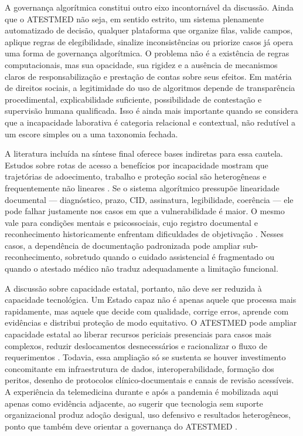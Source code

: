 \documentclass[12pt,a4paper]{article}
\begin{document}
A governança algorítmica constitui outro eixo incontornável da discussão. Ainda que o ATESTMED não seja, em sentido estrito, um sistema plenamente automatizado de decisão, qualquer plataforma que organize filas, valide campos, aplique regras de elegibilidade, sinalize inconsistências ou priorize casos já opera uma forma de governança algorítmica. O problema não é a existência de regras computacionais, mas sua opacidade, sua rigidez e a ausência de mecanismos claros de responsabilização e prestação de contas sobre seus efeitos. Em matéria de direitos sociais, a legitimidade do uso de algoritmos depende de transparência procedimental, explicabilidade suficiente, possibilidade de contestação e supervisão humana qualificada. Isso é ainda mais importante quando se considera que a incapacidade laborativa é categoria relacional e contextual, não redutível a um escore simples ou a uma taxonomia fechada.

A literatura incluída na síntese final oferece bases indiretas para essa cautela. Estudos sobre rotas de acesso a benefícios por incapacidade mostram que trajetórias de adoecimento, trabalho e proteção social são heterogêneas e frequentemente não lineares \parencite{sainsbury2006routesontoincapacitybenefitsfindingsfromqualitati,corden2001incapacitybenefitsandworkincentives}. Se o sistema algorítmico pressupõe linearidade documental — diagnóstico, prazo, CID, assinatura, legibilidade, coerência — ele pode falhar justamente nos casos em que a vulnerabilidade é maior. O mesmo vale para condições mentais e psicossociais, cujo registro documental e reconhecimento historicamente enfrentam dificuldades de objetivação \parencite{hospital2016mentaldisabilityaretrospectivestudyofsocioclinica}. Nesses casos, a dependência de documentação padronizada pode ampliar sub-reconhecimento, sobretudo quando o cuidado assistencial é fragmentado ou quando o atestado médico não traduz adequadamente a limitação funcional.

A discussão sobre capacidade estatal, portanto, não deve ser reduzida à capacidade tecnológica. Um Estado capaz não é apenas aquele que processa mais rapidamente, mas aquele que decide com qualidade, corrige erros, aprende com evidências e distribui proteção de modo equitativo. O ATESTMED pode ampliar capacidade estatal ao liberar recursos periciais presenciais para casos mais complexos, reduzir deslocamentos desnecessários e racionalizar o fluxo de requerimentos \parencite{soares20241031t0000000000asistematicadoatestmednaconcessa}. Todavia, essa ampliação só se sustenta se houver investimento concomitante em infraestrutura de dados, interoperabilidade, formação dos peritos, desenho de protocolos clínico-documentais e canais de revisão acessíveis. A experiência da telemedicina durante e após a pandemia é mobilizada aqui apenas como evidência adjacente, ao sugerir que tecnologia sem suporte organizacional produz adoção desigual, uso defensivo e resultados heterogêneos, ponto que também deve orientar a governança do ATESTMED \parencite{ftouni2022challengesoftelemedicineduringthecovid19pandemica}.
\end{document}
